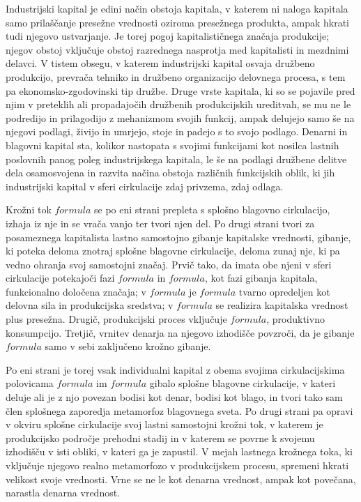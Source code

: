 \documentclass[a5paper]{scrbook}
\begin{document}
Industrijski kapital je edini način obstoja kapitala, v katerem ni naloga kapitala samo prilaščanje presežne vrednosti oziroma presežnega produkta, ampak hkrati tudi njegovo ustvarjanje. Je torej pogoj kapitalističnega značaja produkcije; njegov obstoj vključuje obstoj razrednega nasprotja med kapitalisti in mezdnimi delavci. V tistem obsegu, v katerem industrijski kapital osvaja družbeno produkcijo, prevrača tehniko in družbeno organizacijo delovnega procesa, s tem pa ekonomsko-zgodovinski tip družbe. Druge vrste kapitala, ki so se pojavile pred njim v preteklih ali propadajočih družbenih produkcijskih ureditvah, se mu ne le podredijo in prilagodijo z mehanizmom svojih funkcij, ampak delujejo samo še na njegovi podlagi, živijo in umrjejo, stoje in padejo s to svojo podlago. Denarni in blagovni kapital sta, kolikor nastopata s svojimi funkcijami kot nosilca lastnih poslovnih panog poleg industrijskega kapitala, le še na podlagi družbene delitve dela osamosvojena in razvita načina obstoja različnih funkcijskih oblik, ki jih industrijski kapital v sferi cirkulacije zdaj privzema, zdaj odlaga.

Krožni tok \( formula \) se po eni strani prepleta s splošno blagovno cirkulacijo, izhaja iz nje in se vrača vanjo ter tvori njen del. Po drugi strani tvori za posameznega kapitalista lastno samostojno gibanje kapitalske vrednosti, gibanje, ki poteka deloma znotraj splošne blagovne cirkulacije, deloma zunaj nje, ki pa vedno ohranja svoj samostojni značaj. Prvič tako, da imata obe njeni v sferi cirkulacije potekajoči fazi \( formula \) in \( formula \), kot fazi gibanja kapitala, funkcionalno določena značaja; v \( formula \) je \( formula \) tvarno opredeljen kot delovna sila in produkcijska sredstva; v \( formula \) se realizira kapitalska vrednost plus presežna. Drugič, produkcijski proces vključuje \( formula \), produktivno konsumpcijo. Tretjič, vrnitev denarja na njegovo izhodišče povzroči, da je gibanje \( formula \) samo v sebi zaključeno krožno gibanje.

Po eni strani je torej vsak individualni kapital z obema svojima cirkulacijskima polovicama \( formula \) im \( formula \) gibalo splošne blagovne cirkulacije, v kateri deluje ali je z njo povezan bodisi kot denar, bodisi kot blago, in tvori tako sam člen splošnega zaporedja metamorfoz blagovnega sveta. Po drugi strani pa opravi v okviru splošne cirkulacije svoj lastni samostojni krožni tok, v katerem je produkcijsko področje prehodni stadij in v katerem se povrne k svojemu izhodišču v isti obliki, v kateri ga je zapustil. V mejah lastnega krožnega toka, ki vključuje njegovo realno metamorfozo v produkcijskem procesu, spremeni hkrati velikost svoje vrednosti. Vrne se ne le kot denarna vrednost, ampak kot povečana, narastla denarna vrednost.
\end{document}
